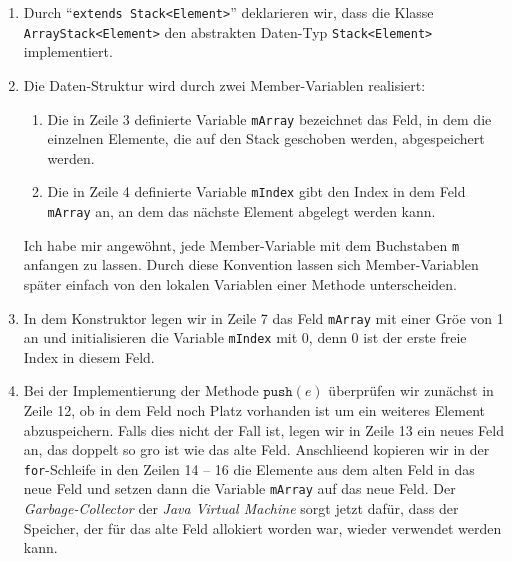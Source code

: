 \begin{enumerate}
\item Durch ``\texttt{extends Stack<Element>}'' deklarieren wir, dass die Klasse
      \texttt{ArrayStack<Element>} den abstrakten Daten-Typ \texttt{Stack<Element>}
      implementiert.
\item Die Daten-Struktur wird durch zwei Member-Variablen realisiert:
      \begin{enumerate}
      \item Die in Zeile 3 definierte Variable \texttt{mArray} bezeichnet das Feld,
            in dem die einzelnen Elemente, die auf den Stack geschoben werden,
            abgespeichert werden.
      \item Die in Zeile 4 definierte Variable \texttt{mIndex} gibt den Index in dem Feld
            \texttt{mArray} an, an dem das n\"achste Element abgelegt werden kann.
      \end{enumerate}
      Ich habe mir angew\"ohnt, jede Member-Variable mit dem Buchstaben \texttt{m}
      anfangen zu lassen.  Durch diese Konvention lassen sich Member-Variablen sp\"ater einfach von
      den lokalen Variablen einer Methode unterscheiden.
\item In dem Konstruktor legen wir in Zeile 7 das Feld \texttt{mArray} mit einer
      Gr\"o\3e von 1 an und initialisieren die Variable \texttt{mIndex} mit 0, denn 
      0 ist der erste freie Index in diesem Feld.
\item Bei der Implementierung der Methode $\texttt{push}(e)$ \"uberpr\"ufen wir zun\"achst
      in Zeile 12, ob in dem Feld noch Platz vorhanden ist um
      ein weiteres Element abzuspeichern.  Falls dies nicht der Fall ist, 
      legen wir in Zeile 13  ein neues Feld an, das doppelt so gro\3 ist wie das alte Feld.
      Anschlie\3end kopieren wir in der \texttt{for}-Schleife in den Zeilen 14 -- 16
      die Elemente aus dem alten Feld in das neue Feld und setzen dann die 
      Variable \texttt{mArray} auf das neue Feld.  Der \emph{Garbage-Collector} der 
      \textsl{Java Virtual Machine}  sorgt jetzt daf\"ur,
      dass der Speicher, der f\"ur das alte Feld allokiert worden war, 
      wieder verwendet werden kann.
      

\end{enumerate}
